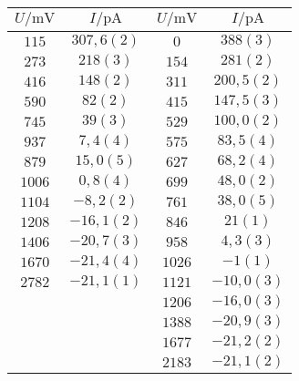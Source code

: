 \begin{figure}[htbp]
{\begin{tabular}{cc||cc}
\hline
$U / \unit{\milli\volt}$ & $I / \unit{\pico\ampere}$ & $U / \unit{\milli\volt}$ & $I / \unit{\pico\ampere}$ \\ 
\hline
$115$ & $307,6(2)$ & $0$ & $388(3)$ \\
$273$ & $218(3)$ & $154$ & $281(2)$ \\
$416$ & $148(2)$ & $311$ & $200,5(2)$ \\
$590$ & $82(2)$ & $415$ & $147,5(3)$ \\
$745$ & $39(3)$ & $529$ & $100,0(2)$ \\
$937$ & $7,4(4)$ & $575$ & $83,5(4)$ \\
$879$ & $15,0(5)$ & $627$ & $68,2(4)$ \\
$1006$ & $0,8(4)$ & $699$ & $48,0(2)$ \\
$1104$ & $-8,2(2)$ & $761$ & $38,0(5)$ \\
$1208$ & $-16,1(2)$ & $846$ & $21(1)$ \\
$1406$ & $-20,7(3)$ & $958$ & $4,3(3)$ \\
$1670$ & $-21,4(4)$ & $1026$ & $-1(1)$ \\
$2782$ & $-21,1(1)$ & $1121$ & $-10,0(3)$ \\
   &    & $1206$ & $-16,0(3)$ \\
   &    & $1388$ & $-20,9(3)$ \\
   &    & $1677$ & $-21,2(2)$ \\
   &    & $2183$ & $-21,1(2)$ \\
\hline\end{tabular}
\label{kennlinie_405nm}
}\end{figure}